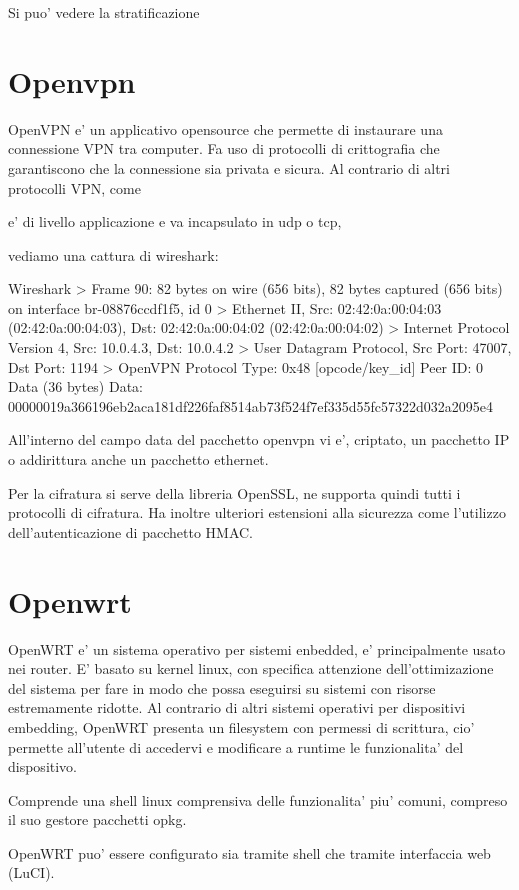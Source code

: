 Si puo' vedere la stratificazione


\section{Openvpn}


OpenVPN e' un applicativo opensource che permette di instaurare una connessione VPN tra computer. Fa uso di protocolli di crittografia che garantiscono che la connessione sia privata e sicura.
Al contrario di altri protocolli VPN, come %

e' di livello applicazione e va incapsulato in udp o tcp,

vediamo una cattura di wireshark:

\begin{bashcode}{Wireshark}{}
> Frame 90: 82 bytes on wire (656 bits), 82 bytes captured (656 bits) on interface br-08876ccdf1f5, id 0
> Ethernet II, Src: 02:42:0a:00:04:03 (02:42:0a:00:04:03), Dst: 02:42:0a:00:04:02 (02:42:0a:00:04:02)
> Internet Protocol Version 4, Src: 10.0.4.3, Dst: 10.0.4.2
> User Datagram Protocol, Src Port: 47007, Dst Port: 1194
> OpenVPN Protocol
        Type: 0x48 [opcode/key_id]
        Peer ID: 0
        Data (36 bytes)
            Data: 00000019a366196eb2aca181df226faf8514ab73f524f7ef335d55fc57322d032a2095e4
\end{bashcode}

All'interno del campo data del pacchetto openvpn vi e', criptato, un pacchetto IP o addirittura anche un pacchetto ethernet.

Per la cifratura si serve della libreria OpenSSL, ne supporta quindi tutti i protocolli di cifratura. Ha inoltre ulteriori estensioni alla sicurezza come l'utilizzo dell'autenticazione di pacchetto HMAC.


\section{Openwrt}

OpenWRT e' un sistema operativo per sistemi enbedded, e' principalmente usato nei router. E' basato su kernel linux, con specifica attenzione dell'ottimizazione del sistema per fare in modo che possa eseguirsi su sistemi con risorse estremamente ridotte.
Al contrario di altri sistemi operativi per dispositivi embedding, OpenWRT presenta un filesystem con permessi di scrittura, cio' permette all'utente di accedervi e modificare a runtime le funzionalita' del dispositivo.

Comprende una shell linux comprensiva delle funzionalita' piu' comuni, compreso il suo gestore pacchetti opkg.

OpenWRT puo' essere configurato sia tramite shell che tramite interfaccia web (LuCI).


